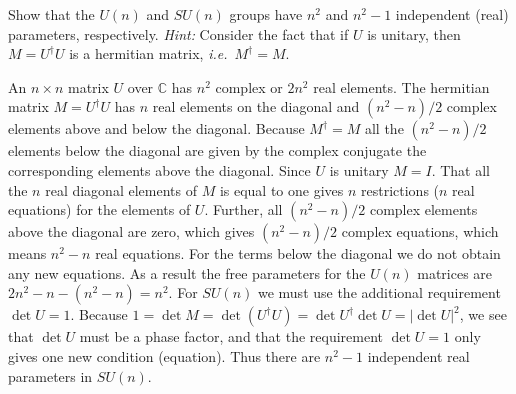 \documentclass[notes.tex]{subfiles}
\begin{document}
\begin{Exercise}[difficulty=1,label=ex:Un_parameters]
Show that the $U(n)$ and $SU(n)$ groups have $n^2$ and $n^2-1$ independent (real) parameters, respectively. {\it Hint:} Consider the fact that if $U$ is unitary, then $M=U^\dagger U$ is a hermitian matrix, {\it i.e.}\ $M^\dagger=M$.
\end{Exercise}
\begin{Answer}
An $n\times n$ matrix $U$ over $\mathbb C$ has $n^2$ complex or $2n^2$ real elements. The hermitian matrix $M=U^\dagger U$ has $n$ real elements on the diagonal
and $(n^2-n)/2$ complex elements above and below the diagonal. Because $M^\dagger=M$ all the $(n^2-n)/2$ elements below the diagonal are given by the complex conjugate the corresponding elements above the diagonal. Since $U$ is unitary $M=I$. That all the $n$ real diagonal elements of $M$ is equal to one gives $n$ restrictions ($n$ real equations) for the elements of $U$. Further, all $(n^2-n)/2$ complex elements above the diagonal are zero, which gives $(n^2-n)/2$ complex equations, which means $n^2-n$ real equations. For the terms below the diagonal we do not obtain any new equations. As a result the free parameters for the $U(n)$ matrices are $2n^2-n-(n^2-n)=n^2$.
For $SU(n)$ we must use the additional requirement $\det U=1$. Because $1=\det M=\det (U^\dagger U)=\det U^\dagger \det U=|\det U|^2$, we see that $\det U$ must be a phase factor, and that the requirement $\det U=1$ only gives one new condition (equation). Thus there are $n^2-1$ independent real parameters in $SU(n)$.
\end{Answer}
\end{document}
